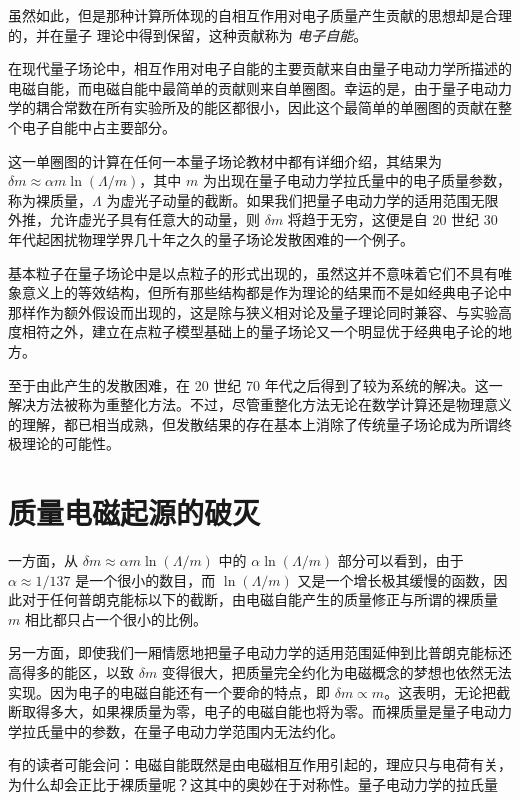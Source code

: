 虽然如此，但是那种计算所体现的自相互作用对电子质量产生贡献的思想却是合理的，并在量子
理论中得到保留，这种贡献称为 \emph{电子自能}。

在现代量子场论中，相互作用对电子自能的主要贡献来自由量子电动力学所描述的电磁自能，而电磁自能中最简单的贡献则来自单圈图。幸运的是，由于量子电动力学的耦合常数在所有实验所及的能区都很小，因此这个最简单的单圈图的贡献在整个电子自能中占主要部分。

这一单圈图的计算在任何一本量子场论教材中都有详细介绍，其结果为 $\delta m \approx \alpha m \ln(\Lambda/m)$，其中 $m$ 为出现在量子电动力学拉氏量中的电子质量参数，称为裸质量，$\Lambda$ 为虚光子动量的截断。如果我们把量子电动力学的适用范围无限外推，允许虚光子具有任意大的动量，则 $\delta m$ 将趋于无穷，这便是自 20 世纪 30 年代起困扰物理学界几十年之久的量子场论发散困难的一个例子。

基本粒子在量子场论中是以点粒子的形式出现的，虽然这并不意味着它们不具有唯象意义上的等效结构，但所有那些结构都是作为理论的结果而不是如经典电子论中那样作为额外假设而出现的，这是除与狭义相对论及量子理论同时兼容、与实验高度相符之外，建立在点粒子模型基础上的量子场论又一个明显优于经典电子论的地方。

至于由此产生的发散困难，在 20 世纪 70 年代之后得到了较为系统的解决。这一解决方法被称为重整化方法。不过，尽管重整化方法无论在数学计算还是物理意义的理解，都已相当成熟，但发散结果的存在基本上消除了传统量子场论成为所谓终极理论的可能性。

\section{质量电磁起源的破灭}

一方面，从 $\delta m\approx \alpha m \ln(\Lambda/m)$ 中的 $\alpha \ln(\Lambda/m)$ 部分可以看到，由于 $\alpha\approx 1/137$ 是一个很小的数目，而 $\ln(\Lambda/m)$ 又是一个增长极其缓慢的函数，因此对于任何普朗克能标以下的截断，由电磁自能产生的质量修正与所谓的裸质量 $m$ 相比都只占一个很小的比例。

另一方面，即使我们一厢情愿地把量子电动力学的适用范围延伸到比普朗克能标还高得多的能区，以致 $\delta m$ 变得很大，把质量完全约化为电磁概念的梦想也依然无法实现。因为电子的电磁自能还有一个要命的特点，即 $\delta m \propto m$。这表明，无论把截断取得多大，如果裸质量为零，电子的电磁自能也将为零。而裸质量是量子电动力学拉氏量中的参数，在量子电动力学范围内无法约化。

有的读者可能会问：电磁自能既然是由电磁相互作用引起的，理应只与电荷有关，为什么却会正比于裸质量呢？这其中的奥妙在于对称性。量子电动力学的拉氏量

